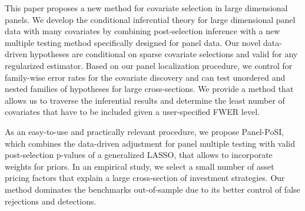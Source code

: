 \documentclass[11pt]{article}
\newcommand{\NL}{\\[.25cm]}
\begin{document}


This paper proposes a new method for covariate selection in large dimensional panels. We develop the conditional inferential theory for large dimensional panel data with many covariates by combining post-selection inference with a new multiple testing method specifically designed for panel data. Our novel data-driven hypotheses are conditional on sparse covariate selections and valid for any regularized estimator. Based on our panel localization procedure, we control for family-wise error rates for the covariate discovery and can test unordered and nested families of hypotheses for large cross-sections. We provide a method that allows us to traverse the inferential results and determine the least number of covariates that have to be included given a user-specified FWER level. 

As an easy-to-use and practically relevant procedure, we propose Panel-PoSI, which combines the data-driven adjustment for panel multiple testing with valid post-selection p-values of a generalized LASSO, that allows to incorporate weights for priors. In an empirical study, we select a small number of asset pricing factors that explain a large cross-section of investment strategies. Our method dominates the benchmarks out-of-sample due to its better control of false rejections and detections.   
\end{document}
